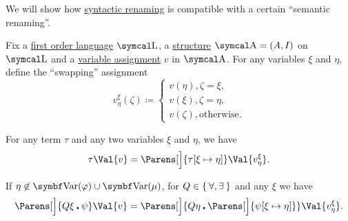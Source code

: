 \begin{proposition}\label{thm:swapping_assignment_compatibility}
  We will show how \hyperref[rem:first_order_substitution_renaming_justification]{syntactic renaming} is compatible with a certain \enquote{semantic renaming}.

  Fix a \hyperref[def:first_order_language]{first order language} \( \CL \), a \hyperref[def:first_order_structure]{structure} \( \CA = (A, I) \) on \( \CL \) and a \hyperref[def:first_order_valuation/variable_assignment]{variable assignment} \( v \) in \( \CA \). For any variables \( \xi \) and \( \eta \), define the \enquote{swapping} assignment
  \begin{equation}\label{eq:thm:swapping_assignment_compatibility/swapping_assignment}
    v_\eta^\xi(\zeta) \coloneqq \begin{cases}
      v(\eta), \zeta = \xi, \\
      v(\xi), \zeta = \eta, \\
      v(\zeta), \text{otherwise}.
    \end{cases}
  \end{equation}

  \begin{PropEnum}
     For any term \( \tau \) and any two variables \( \xi \) and \( \eta \), we have
    \begin{equation}\label{eq:thm:swapping_assignment_compatibility/terms}
      \tau\Val{v}
      =
      \Parens[\Big]{ \tau[\xi \mapsto \eta] }\Val{v_\eta^\xi}.
    \end{equation}

     If \( \eta \not\in \Bold{Var}(\varphi) \cup \Bold{Var}(\mu) \), for \( Q \in \Set{ \forall, \exists } \) and any \( \xi \) we have
    \begin{equation}\label{eq:thm:swapping_assignment_compatibility/formulas}
      \Parens[\Big]{ Q \xi \centerdot \psi }\Val{v}
      =
      \Parens[\Big]{ Q \eta \centerdot \Parens[\Big]{ \psi[\xi \mapsto \eta] } }\Val{v_\eta^\xi}.
    \end{equation}
  \end{PropEnum}
\end{proposition}
